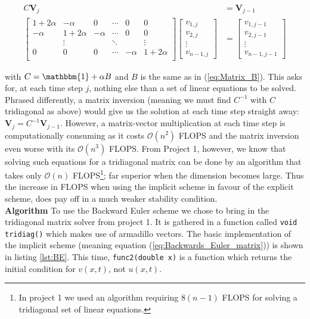 \documentclass[a4paper, 11pt, notitlepage,english]{article}
\newcommand{\id}{\mathbbm{1}}
\begin{document}
\begin{align}
C \boldsymbol{V}_j &= \boldsymbol{V}_{j-1} \\
\begin{bmatrix}
 1+2\alpha & -\alpha & 0 & \cdots & 0 & 0 \\
 -\alpha & 1+2\alpha & -\alpha & \cdots & 0 & 0 \\
  & \vdots & & \ddots & & \vdots \\
 0 & 0 & 0 & \cdots & -\alpha & 1+2\alpha \\
\end{bmatrix}
\begin{bmatrix}
v_{1,j} \\ v_{2,j} \\ \vdots \\ v_{n-1,j}
\end{bmatrix}
&=
\begin{bmatrix}
v_{1,j-1} \\ v_{2,j-1} \\ \vdots \\ v_{n-1,j-1}
\end{bmatrix}
\label{eq:Backwards_Euler_matrix}
\end{align}

with $C = \id + \alpha B$ and $B$ is the same as in (\ref{eq:Matrix_B}). This asks for, at each time step $j$, nothing else than a set of linear equations to be solved. Phrased differently, a matrix inversion (meaning we must find $C^{-1}$ with $C$ tridiagonal as above) would give us the solution at each time step straight away: $\boldsymbol{V}_j = C^{-1} \boldsymbol{V}_{j-1}$. However, a matrix-vector multiplication at each time step is computationally consuming as it costs $\mathcal{O}(n^2)$ FLOPS and the matrix inversion even worse with its $\mathcal{O}(n^3)$ FLOPS. From Project 1, however, we know that solving such equations for a tridiagonal matrix can be done by an algorithm that takes only $\mathcal{O}(n)$ FLOPS\footnote{In project 1 we used an algorithm requiring $8(n-1)$ FLOPS for solving a tridiagonal set of linear equations.}; far superior when the dimension becomes large. Thus the increase in FLOPS when using the implicit scheme in favour of the explicit scheme, does pay off in a much weaker stability condition. \\

\textbf{Algorithm} \newline
To use the Backward Euler scheme we chose to bring in the tridiagonal matrix solver from project 1. It is gathered in a function called \texttt{void tridiag()} which makes use of armadillo vectors. The basic implementation of the implicit scheme (meaning equation (\ref{eq:Backwards_Euler_matrix})) is shown in listing \ref{lst:BE}. This time, \texttt{func2(double x)} is a function which returns the initial condition for $v(x,t)$, not $u(x,t)$. \newpage
\end{document}
